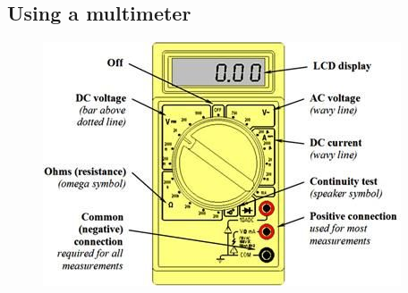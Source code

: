 \documentclass{article}
\theoremstyle{definition}
\theoremstyle{definition}
\theoremstyle{remark}
\begin{document}


  \subsection{Using a multimeter} %
  \label{sub:using_a_multimeter}
  
    \begin{figure}[!ht]
      \centering
      \includegraphics[width=0.65\paperwidth]{Images/image_a_1_(multimeter).png}
    \end{figure}


\end{document}
